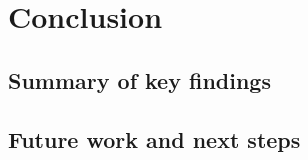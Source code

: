
\chapter{Conclusion}
\label{chap:conclusion}

\section{Summary of key findings}

\section{Future work and next steps}